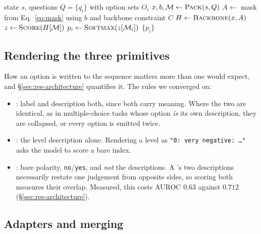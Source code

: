 \begin{algorithm}[t]
\caption{Forward pass for one packed instance}
\label{alg:forward}
\begin{algorithmic}[1]
\Require state $s$, questions $Q=\{q_i\}$ with option sets $O_i$
\State $x, b, \mathcal{M} \gets \textproc{Pack}(s, Q)$
\State $A \gets$ mask from Eq.~\ref{eq:mask} using $b$ and backbone
  constraint $C$
\State $H \gets \textproc{Backbone}(x, A)$
\State $z \gets \textproc{Score}(H[\mathcal{M}])$
  \State $p_i \gets \textproc{Softmax}(z[\mathcal{M}_i])$
\EndFor
\State \Return $\{p_i\}$
\end{algorithmic}
\end{algorithm}

\subsection{Rendering the three primitives}

How an option is written to the sequence matters more than one would
expect, and \S\ref{sec:res-architecture} quantifies it. The rules we
converged on:

\begin{itemize}[leftmargin=1.4em,itemsep=0.25em]
  \item \choice{}: label and description both, since both carry meaning.
    Where the two are identical, as in multiple-choice tasks whose
    option \emph{is} its own description, they are collapsed, or every
    option is emitted twice.
  \item \score{}: the level description alone. Rendering a level as
    \texttt{"0: very negative: \ldots"} asks the model to score a bare
    index.
  \item \noul{}: bare polarity, \texttt{no}/\texttt{yes}, and \emph{not}
    the descriptions. A \noul{}'s two descriptions necessarily restate one
    judgement from opposite sides, so scoring both measures their overlap.
    Measured, this costs AUROC $0.63$ against $0.712$
    (\S\ref{sec:res-architecture}).
\end{itemize}

\subsection{Adapters and merging}
\label{sec:method-lora}

